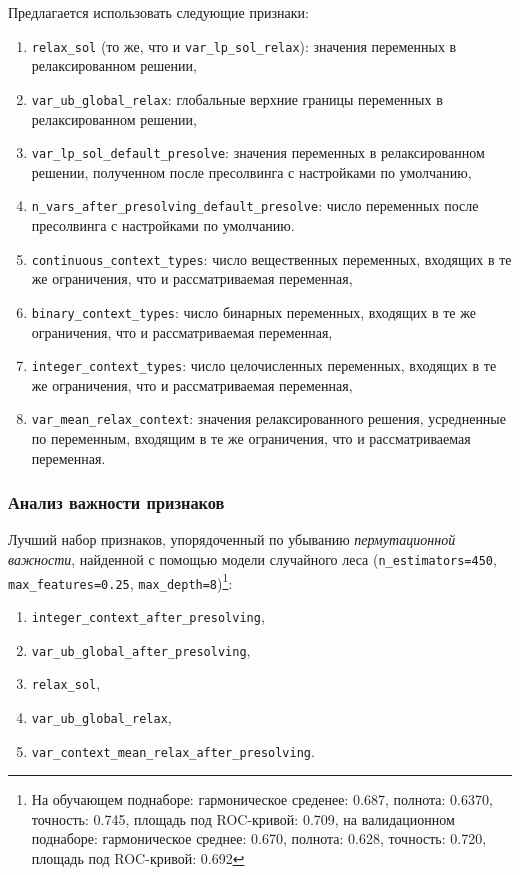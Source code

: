 \documentclass[%
	11pt,
	a4paper,
	utf8,
		]{article}
\begin{document}
Предлагается использовать следующие признаки:
\begin{enumerate}
	\item \verb|relax_sol| (то же, что и \verb|var_lp_sol_relax|): значения переменных в релаксированном решении,
	
	\item \verb|var_ub_global_relax|: глобальные верхние границы переменных в релаксированном решении,
	
	\item \verb|var_lp_sol_default_presolve|: значения переменных в релаксированном решении, полученном после пресолвинга с настройками по умолчанию,
	
	\item \verb|n_vars_after_presolving_default_presolve|: число переменных после пресолвинга с настройками по умолчанию.
	
	\item \verb|continuous_context_types|: число вещественных переменных, входящих в те же ограничения, что и рассматриваемая переменная,
	
	\item \verb|binary_context_types|: число бинарных переменных, входящих в те же ограничения, что и рассматриваемая переменная,
	
	\item \verb|integer_context_types|: число целочисленных переменных, входящих в те же ограничения, что и рассматриваемая переменная,
	
	\item \verb|var_mean_relax_context|: значения релаксированного решения, усредненные по переменным, входящим в те же ограничения, что и рассматриваемая переменная.
\end{enumerate}

\subsubsection{Анализ важности признаков}

Лучший набор признаков, упорядоченный по убыванию \emph{пермутационной важности}, найденной с помощью модели случайного леса (\verb|n_estimators=450|, \verb|max_features=0.25|, \verb|max_depth=8|)\footnote{На обучающем поднаборе: гармоническое среденее: 0.687, полнота: 0.6370, точность: 0.745, площадь под ROC-кривой: 0.709, на валидационном поднаборе: гармоническое среднее: 0.670, полнота: 0.628, точность: 0.720, площадь под ROC-кривой: 0.692}:
\begin{enumerate}
	\item \verb|integer_context_after_presolving|,
	
	\item \verb|var_ub_global_after_presolving|,
	
	\item \verb|relax_sol|,
	
	\item \verb|var_ub_global_relax|,
	
	\item \verb|var_context_mean_relax_after_presolving|.
\end{enumerate}
\end{document}

